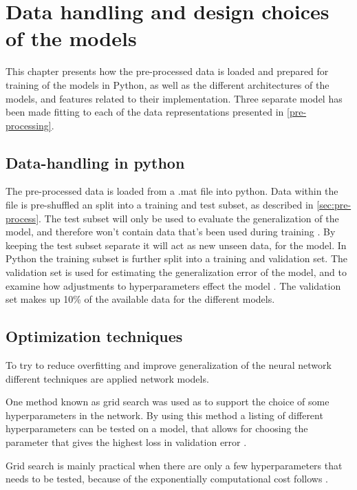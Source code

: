 \section{Data handling and design choices of the models}
This chapter presents how the pre-processed data is loaded and prepared for training of the models in Python, as well as the different architectures of the models, and features related to their implementation. Three separate model has been made fitting to each of the data representations presented in \ref{pre-processing}.  

\subsection{Data-handling in python}
The pre-processed data is loaded from a .mat file into python. 
Data within the file is pre-shuffled an split into a training and test subset, as described in \autoref{sec:pre-process}. 
The test subset will only be used to evaluate the generalization of the model, and therefore won't contain data that's been used during training \citep{Duda2000}. 
By keeping the test subset separate it will act as new unseen data, for the model. 
In Python the training subset is further split into a training and validation set. The validation set is used for estimating the generalization error of the model, and to examine how adjustments to hyperparameters effect the model \citep{Duda2000}.   
The validation set makes up 10\% of the available data for the different models. 



\subsection{Optimization techniques}
To try to reduce overfitting and improve generalization of the neural network different techniques are applied network models. 

One method known as grid search was used as to support the choice of some hyperparameters in the network. By using this method a listing of different hyperparameters can be tested on a model, that allows for choosing the parameter that gives the highest loss in validation error \citep{Goodfellow2016}.

Grid search is mainly practical when there are only a few hyperparameters that needs to be tested, because of the exponentially computational cost follows \citep{Goodfellow2016}.    


